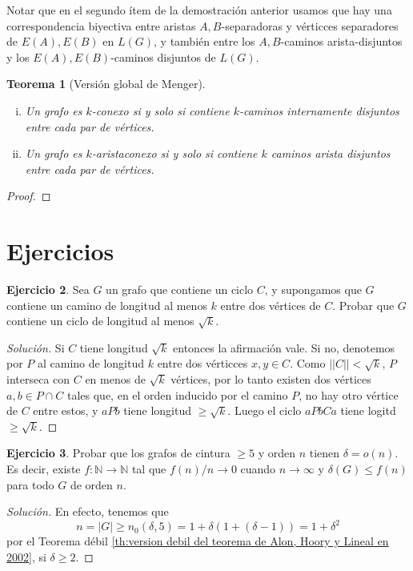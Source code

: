 \documentclass[12pt]{report}
\theoremstyle{plain}
\newtheorem{theorem}{Teorema}[section]
\theoremstyle{definition}
\newtheorem{exercise}[theorem]{Ejercicio}
\newenvironment{solution}{\begin{proof}[Solución]}{\end{proof}}
\newcommand{\naturals}{\mathbb{N}}
\newcommand{\abs}[1]{\left \vert #1 \right \vert}
\newcommand{\Abs}[1]{\left \vert \left \vert #1 \right \vert \right \vert}
\begin{document}
Notar que en el segundo ítem de la demostración anterior usamos que hay una correspondencia biyectiva entre aristas $A,B$-separadoras y vérticces separadores de $E(A),E(B)$ en $L(G)$, y también entre los $A,B$-caminos arista-disjuntos y los $E(A),E(B)$-caminos disjuntos de $L(G)$.

\begin{theorem}[Versión global de Menger]
\begin{enumerate}[(i)]
\item Un grafo es $k$-conexo si y solo si contiene $k$-caminos internamente disjuntos entre cada par de vértices.
\item Un grafo es $k$-aristaconexo si y solo si contiene $k$ caminos arista disjuntos entre cada par de vértices.
\end{enumerate}
\end{theorem}
\begin{proof}

\end{proof}





\section{Ejercicios}

\begin{exercise}
Sea $G$ un grafo que contiene un ciclo $C$, y supongamos que $G$ contiene un camino de longitud al menos $k$ entre
dos vértices de $C$. Probar que $G$ contiene un ciclo de longitud al menos $\sqrt k$.
\end{exercise}
\begin{solution}
Si $C$ tiene longitud $\sqrt k$ entonces la afirmación vale. Si no, denotemos por $P$ al camino de longitud $k$
entre dos vérticces $x,y \in C$. Como $\Abs C < \sqrt k$, $P$ interseca con $C$ en menos de $\sqrt k$ vértices,
por lo tanto existen dos vértices $a,b \in P \cap C$ tales que, en el orden inducido por el camino $P$, no hay otro
vértice de $C$ entre estos, y $a P b$ tiene longitud $\geq \sqrt k$. Luego el ciclo $a P b C a$ tiene logitd $\geq \sqrt k$.
\end{solution}


\begin{exercise}
Probar que los grafos de cintura $\geq 5$ y orden $n$ tienen $\delta = o (n)$. Es decir, existe $f : \naturals \rightarrow \naturals$ tal que $f(n) /n \rightarrow 0$ cuando $n \rightarrow \infty$ y $\delta (G) \leq f(n)$ para todo $G$ de orden $n$.
\end{exercise}
\begin{solution}
En efecto, tenemos que
$$
n = \abs G \geq n_0 ( \delta, 5) = 1 + \delta (1 + (\delta -1)) = 1 + \delta^2
$$
por el Teorema débil \ref{th:version debil del teorema de Alon, Hoory y Lineal en 2002}, si $\delta \geq 2$.
\end{solution}
\end{document}
